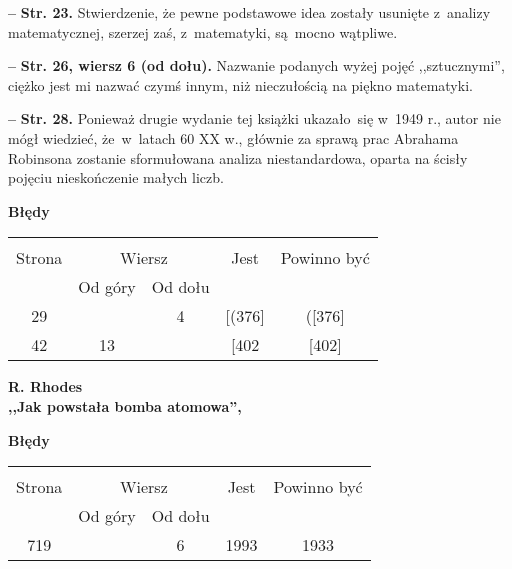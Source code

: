 \documentclass[a4paper,11pt]{article}
\newcommand{\spaceTwo}{2em}
\newcommand{\spaceFour}{0.5em}
\newcommand{\tb}{\textbf}
\newcommand{\noi}{\noindent}
\newcommand{\start}{\noi \tb{--} {}}
\newcommand{\Center}[1]{\begin{center} #1 \end{center}}
\newcommand{\CenterTB}[1]{\Center{\tb{#1}}}
\newcommand{\Str}[1]{\tb{Str. #1.}}
\newcommand{\StrWd}[2]{\tb{Str. #1, wiersz #2 (od dołu).}}
\newcommand{\Work}[1]{ \begin{center} {\large \tb{#1}} \end{center} }
\begin{document}
\vspace{\spaceFour}


\start \Str{23} Stwierdzenie, że pewne podstawowe idea zostały
usunięte z~analizy matematycznej, szerzej zaś, z~matematyki, są~mocno
wątpliwe.

\vspace{\spaceFour}


\start \StrWd{26}{6} Nazwanie podanych wyżej pojęć ,,sztucznymi'',
ciężko jest mi nazwać czymś innym, niż nieczułością na piękno
matematyki.

\vspace{\spaceFour}


\start \Str{28} Ponieważ drugie wydanie tej książki ukazało~się w~1949
r., autor nie mógł wiedzieć, że~w~latach 60 XX w., głównie za sprawą
prac Abrahama Robinsona zostanie sformułowana analiza niestandardowa,
oparta na ścisły pojęciu nieskończenie małych liczb.


\CenterTB{Błędy}
\begin{center}
  \begin{tabular}{|c|c|c|c|c|}
    \hline
    & \multicolumn{2}{c|}{} & & \\
    Strona & \multicolumn{2}{c|}{Wiersz}& Jest & Powinno być \\ \cline{2-3}
    & Od góry & Od dołu &  &  \\ \hline
    29 & & 4 & [(376] & ([376] \\
    42 & 13 & & [402 & [402] \\
    \hline
  \end{tabular}
\end{center}

\vspace{\spaceTwo}





\Work{
  R. Rhodes \\
  ,,Jak powstała bomba atomowa'', \cite{Rhodes00} }


\CenterTB{Błędy}
\begin{center}
  \begin{tabular}{|c|c|c|c|c|}
    \hline
    & \multicolumn{2}{c|}{} & & \\
    Strona & \multicolumn{2}{c|}{Wiersz}& Jest & Powinno być \\ \cline{2-3}
    & Od góry & Od dołu &  &  \\ \hline
    719 & & 6 & 1993 & 1933 \\
    \hline
  \end{tabular}
\end{center}
\end{document}
